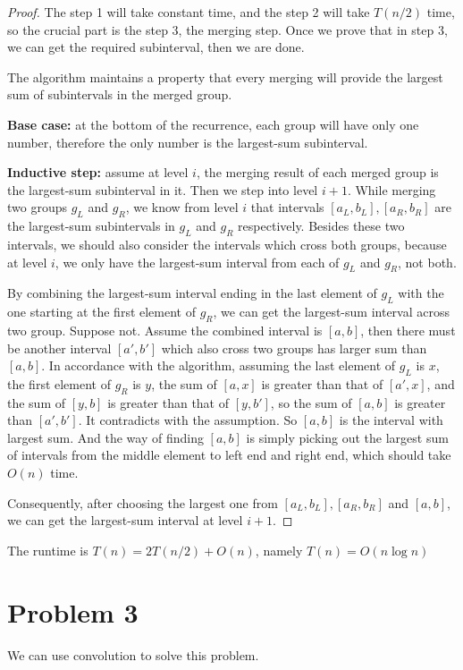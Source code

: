 \documentclass[letter,12pt]{article}
\begin{document}
\begin{proof}
The step 1 will take constant time, and the step 2 will take $T(n/2)$ time,
so the crucial part is the step 3, the merging step. Once we prove that 
in step 3, we can get the required subinterval, then we are done.

The algorithm maintains a property that every merging will provide the
largest sum of subintervals in the merged group.

\textbf{Base case:} at the bottom of the recurrence, each group will have only one number, therefore the only number is the largest-sum subinterval.

\textbf{Inductive step:} assume at level $i$, the merging result of each 
merged group is the largest-sum subinterval in it. Then we step into level
$i+1$. While merging two groups $g_L$ and $g_R$, we know from level
$i$ that intervals $[a_L, b_L], [a_R,b_R]$ are the largest-sum subintervals
in $g_L$ and $g_R$ respectively. Besides these two intervals, we should 
also consider the intervals which cross both groups, because at level $i$, we only have the largest-sum interval from each of $g_L$ and $g_R$, not
both. 

By combining the largest-sum interval ending in the last element of
$g_L$ with the one starting at the first element of $g_R$, we can get the 
largest-sum interval across two group. Suppose not. Assume the 
combined interval is $[a,b]$, then there must be another interval $[a',b']$ 
which also cross two groups has larger sum than $[a,b]$. In accordance 
with the algorithm, assuming the last element of $g_L$ is $x$, the first 
element of $g_R$ is $y$, the sum of $[a, x]$ is greater than that of 
$[a', x]$, and the sum of $[y, b]$ is greater than that of $[y, b']$, so 
the sum of $[a,b]$ is greater than $[a',b']$. It contradicts with the 
assumption. So $[a, b]$ is the interval with largest sum. And the way of
finding $[a,b]$ is simply picking out the largest sum of intervals from 
the middle element to left end and right end, which should take $O(n)$
time.

Consequently, after choosing the largest one from $[a_L,b_L], [a_R,b_R]$
and $[a,b]$, we can get the largest-sum interval at level $i+1$.
\end{proof}
The runtime is $T(n)=2T(n/2) + O(n)$, namely $T(n)=O(n\log n)$

\section*{Problem 3}
We can use convolution to solve this problem.
\end{document}
